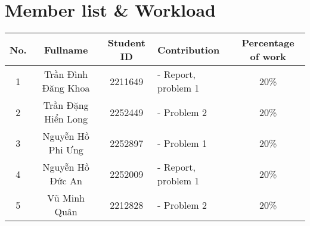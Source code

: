 \newpage

\section{Member list \& Workload}

\begin{center}
\begin{tabular}{|c|c|c|l|c|}
\hline
\textbf{No.} & \textbf{Fullname} & \textbf{Student ID} & \textbf{Contribution} & \textbf{Percentage of work}\\
\hline 
\multirow{1}{*}{1} & \multirow{1}{*}{Trần Đình Đăng Khoa} & \multirow{1}{*}{2211649} & - Report, problem 1& \multirow{1}{*}{20\%}\\
\hline 
\multirow{1}{*}{2} & \multirow{1}{*}{Trần Đặng Hiển Long} & \multirow{1}{*}{2252449} & - Problem 2& \multirow{1}{*}{20\%}\\
\hline
\multirow{1}{*}{3} & \multirow{1}{*}{Nguyễn Hồ Phi Ưng} & \multirow{1}{*}{2252897} & - Problem 1& \multirow{1}{*}{20\%}\\
\hline
\multirow{1}{*}{4} & \multirow{1}{*}{Nguyễn Hồ Đức An} & \multirow{1}{*}{2252009} & - Report, problem 1& \multirow{1}{*}{20\%}\\
\hline
\multirow{1}{*}{5} & \multirow{1}{*}{Vũ Minh Quân} & \multirow{1}{*}{2212828} & - Problem 2 & \multirow{1}{*}{20\%}\\
\hline
\end{tabular}
\end{center}